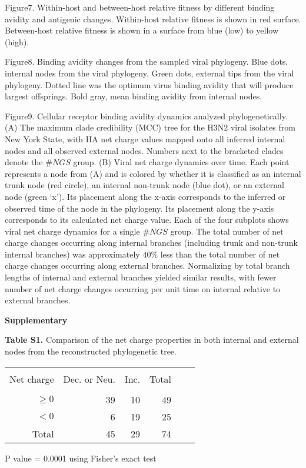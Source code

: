 \documentclass[12pt,a4paper]{article}
\begin{document}
Figure7. Within-host and between-host relative fitness by different binding avidity and antigenic  changes. Within-host relative fitness is shown in red surface. Between-host relative fitness is shown in a surface from blue (low) to yellow (high).

Figure8. Binding avidity changes from the sampled viral phylogeny. Blue dots, internal nodes from the viral phylogeny. Green dots, external tips from the viral phylogeny. Dotted line was the optimum virus binding avidity that will produce largest offsprings. Bold gray, mean binding avidity from internal nodes. 

Figure9. Cellular receptor binding avidity dynamics analyzed phylogenetically. (A) The maximum clade credibility (MCC) tree for the H3N2 viral isolates from New York State, with HA net charge values mapped onto all inferred internal nodes and all observed external nodes. Numbers next to the bracketed clades denote the $\#NGS$ group. (B) Viral net charge dynamics over time. Each point represents a node from (A) and is colored by whether it is classified as an internal trunk node (red circle), an internal non-trunk node (blue dot), or an external node (green ‘x’). Its placement along the x-axis corresponds to the inferred or observed time of the node in the phylogeny. Its placement along the y-axis corresponds to its calculated net charge value. Each of the four subplots shows viral net charge dynamics for a single $\#NGS$ group. The total number of net charge changes occurring along internal branches (including trunk and non-trunk internal branches) was approximately $40\%$ less than the total number of net charge changes occurring along external branches. Normalizing by total branch lengths of internal and external branches yielded similar results, with fewer number of net charge changes occurring per unit time on internal relative to external branches.



\clearpage
{\bf Supplementary} 
\clearpage

\begin{table}
{\bf Table S1.} Comparison of the net charge properties in both internal and external nodes from the reconstructed phylogenetic tree.

\begin{tabular*}{10cm}{rrrrrr}
\hline\hline \\%


Net charge&  Dec. or Neu. &  Inc. & Total  & \\
\hline \\ %
$ \geq 0$ &  39           &  10   & 49     &  \\
$ < 0$ &   6           &  19   & 25     &  \\
Total  &  45           &  29   & 74   &  \\
\hline %
\end{tabular*}
\end{table}
P value = 0.0001 using Fisher's exact test
\end{document}
